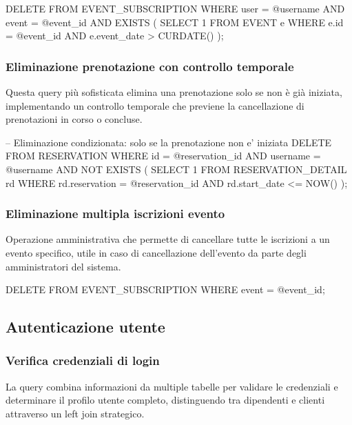 \documentclass[a4paper,12pt]{report}
\begin{document}
\begin{sqlcode}[caption={Query per eliminazione iscrizione evento}]
DELETE FROM EVENT_SUBSCRIPTION 
WHERE user = @username 
  AND event = @event_id
  AND EXISTS (
    SELECT 1 FROM EVENT e 
    WHERE e.id = @event_id 
    AND e.event_date > CURDATE()
  );
\end{sqlcode}

\subsubsection{Eliminazione prenotazione con controllo temporale}
Questa query più sofisticata elimina una prenotazione solo se non è già iniziata, implementando un controllo temporale che previene la cancellazione di prenotazioni in corso o concluse.

\begin{sqlcode}[caption={Query per eliminazione prenotazione con controllo temporale}]
-- Eliminazione condizionata: solo se la prenotazione non e' iniziata
DELETE FROM RESERVATION 
WHERE id = @reservation_id 
  AND username = @username
  AND NOT EXISTS (
    SELECT 1 FROM RESERVATION_DETAIL rd 
    WHERE rd.reservation = @reservation_id 
    AND rd.start_date <= NOW()
  );
\end{sqlcode}

\subsubsection{Eliminazione multipla iscrizioni evento}
Operazione amministrativa che permette di cancellare tutte le iscrizioni a un evento specifico, utile in caso di cancellazione dell'evento da parte degli amministratori del sistema.

\begin{sqlcode}[caption={Query per eliminazione multipla iscrizioni evento}]
DELETE FROM EVENT_SUBSCRIPTION 
WHERE event = @event_id;
\end{sqlcode}

\subsection{Autenticazione utente} 

\subsubsection{Verifica credenziali di login} 
La query combina informazioni da multiple tabelle per validare le credenziali e determinare il profilo utente completo, distinguendo tra dipendenti e clienti attraverso un left join strategico.
\end{document}
